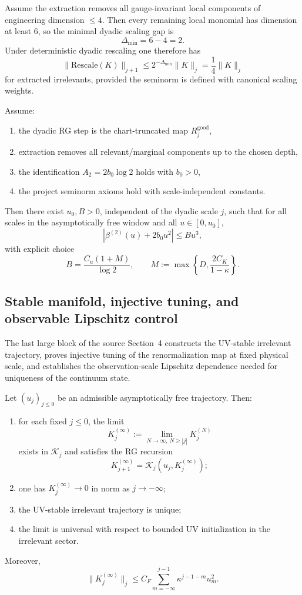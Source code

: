 \begin{lemma}
Assume the extraction removes all gauge-invariant local components of engineering dimension $\le 4$. Then every remaining local monomial has dimension at least $6$, so the minimal dyadic scaling gap is
\[
\Delta_{\min}=6-4=2.
\]
Under deterministic dyadic rescaling one therefore has
\[
\|\mathrm{Rescale}(K)\|_{j+1}\le 2^{-\Delta_{\min}}\|K\|_j = \frac14\|K\|_j
\]
for extracted irrelevants, provided the seminorm is defined with canonical scaling weights.
\end{lemma}

\begin{theorem}
Assume:
\begin{enumerate}
\item the dyadic RG step is the chart-truncated map $R_j^{\mathrm{good}}$,
\item extraction removes all relevant/marginal components up to the chosen depth,
\item the identification $A_2=2b_0\log 2$ holds with $b_0>0$,
\item the project seminorm axioms hold with scale-independent constants.
\end{enumerate}
Then there exist $u_0,B>0$, independent of the dyadic scale $j$, such that for all scales in the asymptotically free window and all $u\in[0,u_0]$,
\[
|\beta^{(2)}(u)+2b_0u^2| \le Bu^3,
\]
with explicit choice
\[
B = \frac{C_u(1+M)}{\log 2},
\qquad
M:=\max\!\left\{D,\frac{2C_K}{1-\kappa}\right\}.
\]
\end{theorem}

\subsection{Stable manifold, injective tuning, and observable Lipschitz control}
The last large block of the source Section~4 constructs the UV-stable irrelevant trajectory, proves injective tuning of the renormalization map at fixed physical scale, and establishes the observation-scale Lipschitz dependence needed for uniqueness of the continuum state.

\begin{theorem}
Let $(u_j)_{j\le 0}$ be an admissible asymptotically free trajectory. Then:
\begin{enumerate}
\item for each fixed $j\le 0$, the limit
\[
K_j^{(\infty)} := \lim_{N\to \infty,\,N\ge |j|} K_j^{(N)}
\]
exists in $\mathcal K_j$ and satisfies the RG recursion
\[
K_{j+1}^{(\infty)} = \mathcal K_j(u_j,K_j^{(\infty)});
\]
\item one has $K_j^{(\infty)}\to 0$ in norm as $j\to -\infty$;
\item the UV-stable irrelevant trajectory is unique;
\item the limit is universal with respect to bounded UV initialization in the irrelevant sector.
\end{enumerate}
Moreover,
\[
\|K_j^{(\infty)}\|_j \le C_F \sum_{m=-\infty}^{j-1}\kappa^{j-1-m}u_m^2.
\]
\end{theorem}


